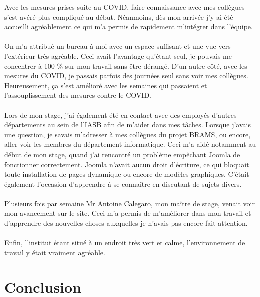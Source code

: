 \documentclass[11pt]{article}
\begin{document}
Avec les mesures prises suite au COVID, faire connaissance avec mes collègues s'est avéré plus compliqué au début.
Néanmoins, dès mon arrivée j'y ai été accueilli agréablement ce qui m'a permis de rapidement m'intégrer dans l'équipe.\\
\\
On m'a attribué un bureau à moi avec un espace suffisant et une vue vers l'extérieur très agréable.
Ceci avait l'avantage qu'étant seul, je pouvais me concentrer à 100 \% sur mon travail sans être dérangé.
D'un autre côté, avec les mesures du COVID, je passais parfois des journées seul sans voir mes collègues.
Heureusement, ça s'est amélioré avec les semaines qui passaient et l'assouplissement des mesures contre le COVID.\\
\\
Lors de mon stage, j'ai également été en contact avec des employés d'autres départements au sein de l'IASB afin de m'aider dans mes tâches.
Lorsque j'avais une question, je savais m'adresser à mes collègues du projet BRAMS, ou encore, aller voir les membres du département informatique.
Ceci m'a aidé notamment au début de mon stage, quand j'ai rencontré un problème empêchant Joomla de fonctionner correctement.
Joomla n'avait aucun droit d'écriture, ce qui bloquait toute installation de pages dynamique ou encore de modèles graphiques.
C'était également l'occasion d'apprendre à se connaître en discutant de sujets divers.\\
\\
Plusieurs fois par semaine Mr Antoine Calegaro, mon maître de stage, venait voir mon avancement sur le site.
Ceci m'a permis de m'améliorer dans mon travail et d'apprendre des nouvelles choses auxquelles je n'avais pas encore fait attention.\\
\\
Enfin, l'institut étant situé à un endroit très vert et calme, l'environnement de travail y était vraiment agréable.

\newpage

\section{Conclusion}
\end{document}
